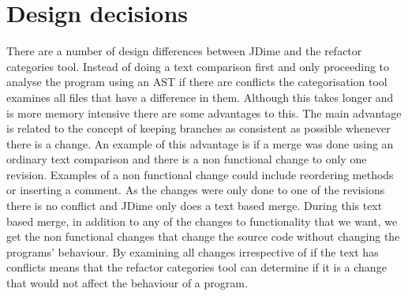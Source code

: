 % 
% 
% 

\section{Design decisions}
% 

% 

There are a number of design differences between JDime and the refactor categories tool.  Instead of doing a text comparison first and only proceeding to analyse the program using an AST if there are conflicts the categorisation tool examines all files that have a difference in them.  Although this takes longer and is more memory intensive there are some advantages to this. The main advantage is related to the concept of keeping branches as consistent as possible whenever there is a change. An example of this advantage is if a merge was done using an ordinary text comparison and there is a non functional change to only one revision. Examples of a non functional change could include reordering methods or inserting a comment.  As the changes were only done to one of the revisions there is no conflict and JDime only does a text based merge.  During this text based merge, in addition to any of the changes to functionality that we want, we get the non functional changes that change the source code without changing the programs' behaviour. By examining all changes irrespective of if the text has conflicts means that the refactor categories tool can determine if it is a change that would not affect the behaviour of a program.

